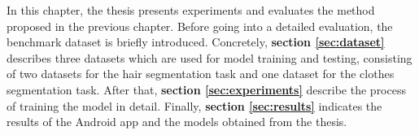 \label{ch:chap4} 

In this chapter, the thesis presents experiments and evaluates the method proposed in the previous chapter. Before going into a detailed evaluation, the benchmark dataset is briefly introduced. Concretely, \textbf{section \ref{sec:dataset}} describes three datasets which are used for model training and testing, consisting of two datasets for the hair segmentation task and one dataset for the clothes segmentation task. After that, \textbf{section \ref{sec:experiments}} describe the process of training the model in detail. Finally, \textbf{section \ref{sec:results}} indicates the results of the Android app and the models obtained from the thesis.



